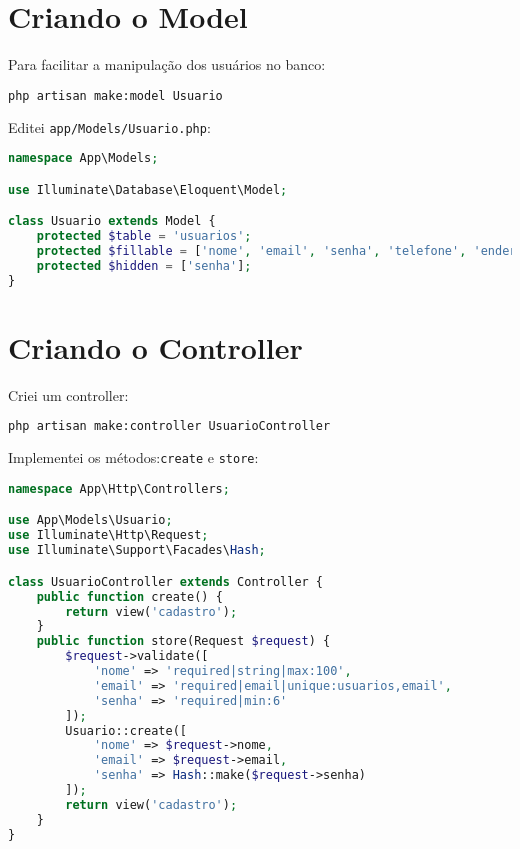 \documentclass{article}
\begin{document}
\section{Criando o Model}
Para facilitar a manipulação dos usuários no banco:

\begin{lstlisting}[language=bash]
php artisan make:model Usuario
\end{lstlisting}

Editei \texttt{app/Models/Usuario.php}:

\begin{lstlisting}[language=PHP]
namespace App\Models;

use Illuminate\Database\Eloquent\Model;

class Usuario extends Model {
    protected $table = 'usuarios';
    protected $fillable = ['nome', 'email', 'senha', 'telefone', 'endereco', 'data_nascimento', 'ativo'];
    protected $hidden = ['senha'];
}
\end{lstlisting}

\section{Criando o Controller}

Criei um controller:

\begin{lstlisting}[language=bash]
php artisan make:controller UsuarioController
\end{lstlisting}

Implementei os métodos:\texttt{create} e \texttt{store}:

\begin{lstlisting}[language=PHP]
namespace App\Http\Controllers;

use App\Models\Usuario;
use Illuminate\Http\Request;
use Illuminate\Support\Facades\Hash;

class UsuarioController extends Controller {
    public function create() {
        return view('cadastro');
    }
    public function store(Request $request) {
        $request->validate([
            'nome' => 'required|string|max:100',
            'email' => 'required|email|unique:usuarios,email',
            'senha' => 'required|min:6'
        ]);
        Usuario::create([
            'nome' => $request->nome,
            'email' => $request->email,
            'senha' => Hash::make($request->senha)
        ]);
        return view('cadastro');
    }
}
\end{lstlisting}
\end{document}
